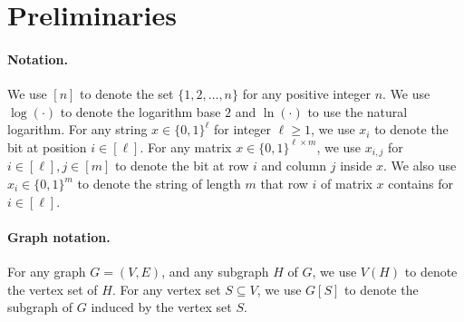 \documentclass[11pt]{article}
\theoremstyle{definition}
\renewcommand{\geq}{\geqslant}
\begin{document}







	



\section{Preliminaries}

\paragraph{Notation.}
We use $[n]$ to denote the set $\{1, 2, \ldots, n\}$ for any positive integer $n$. We use $\log(\cdot)$ to denote the logarithm base $2$ and $\ln{(\cdot)}$ to use the natural logarithm. 
For any string $x \in \{0,1\}^{\ell}$ for integer $\ell \geq 1$, we use $x_i$ to denote the bit at position $i \in [\ell]$. For any matrix $x \in \{0,1\}^{\ell \times m}$, we use $x_{i,j}$ for $i \in [\ell], j \in [m]$ to denote the bit at row $i$ and column $j$ inside $x$. We also use $x_i \in \{0,1\}^{m}$ to denote the string of length $m$ that row $i$ of matrix $x $ contains for $i \in [\ell]$. 



\paragraph{Graph notation.}
For any graph $G = (V, E)$, and any subgraph $H$ of $G$, we use $V(H)$ to denote the vertex set of $H$. For any vertex set $S \subseteq V$, we use $G[S]$ to denote the subgraph of $G$ induced by the vertex set $S$.
\end{document}
